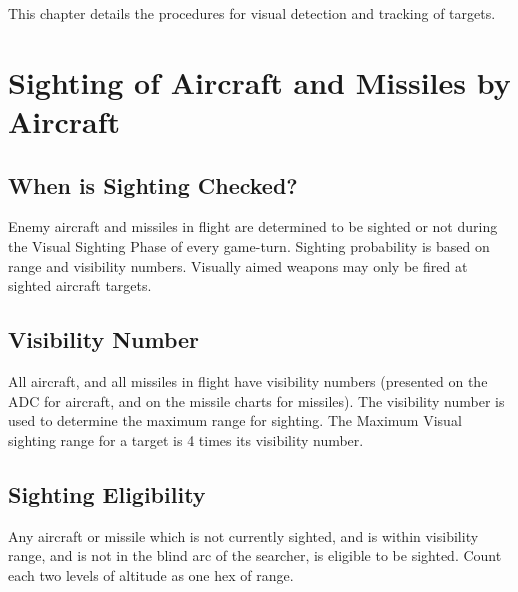 
\label{rule:visual-sighting}

This chapter details the procedures for visual detection and tracking of targets. 

\section{Sighting of Aircraft and Missiles by Aircraft}
\label{rule:sighting-aircraft-and-missiles}

\subsection{When is Sighting Checked?}  Enemy aircraft and missiles in flight are determined to be sighted or not during the Visual Sighting Phase of every game-turn. Sighting probability is based on range and visibility numbers. Visually aimed weapons may only be fired at sighted aircraft targets.

\subsection{Visibility Number} All aircraft, and all missiles in flight have visibility numbers (presented on the ADC for aircraft, and on the missile charts for missiles). The visibility number is used to determine the maximum range for sighting. The Maximum Visual sighting range for a target is 4 times its visibility number.

\subsection{Sighting Eligibility} Any aircraft or missile which is not currently sighted, and is within visibility range, and is not in the blind arc of the searcher, is eligible to be sighted. Count each two levels of altitude as one hex of range.

